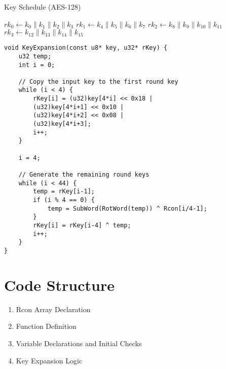\begin{algorithm}[H]
	\caption{Key Schedule (AES-128)}
	
	\BlankLine
	\( rk_0 \leftarrow k_0\parallel k_1\parallel k_2 \parallel k_3 \)\;
	\( rk_1 \leftarrow k_4\parallel k_5\parallel k_6 \parallel k_7 \)\;
	\( rk_2 \leftarrow k_8\parallel k_9\parallel k_{10} \parallel k_{11} \)\;
	\( rk_3 \leftarrow k_{12}\parallel k_{13}\parallel k_{14} \parallel k_{15} \)\;
\end{algorithm}
\begin{lstlisting}[style=C, caption={AES Key Expansion},captionpos=t]
void KeyExpansion(const u8* key, u32* rKey) {
	u32 temp;
	int i = 0;
	
	// Copy the input key to the first round key
	while (i < 4) {
		rKey[i] = (u32)key[4*i] << 0x18 | 
		(u32)key[4*i+1] << 0x10 | 
		(u32)key[4*i+2] << 0x08 | 
		(u32)key[4*i+3];
		i++;
	}
	
	i = 4;
	
	// Generate the remaining round keys
	while (i < 44) {
		temp = rKey[i-1];
		if (i % 4 == 0) {
			temp = SubWord(RotWord(temp)) ^ Rcon[i/4-1];
		}
		rKey[i] = rKey[i-4] ^ temp;
		i++;
	}
}
\end{lstlisting}

\section{Code Structure}
\begin{enumerate}
	\item Rcon Array Declaration
	\item Function Definition
	\item Variable Declarations and Initial Checks
	\item Key Expansion Logic
\end{enumerate}


